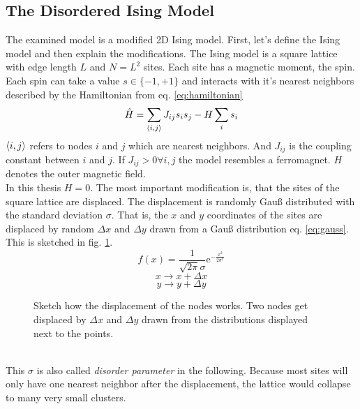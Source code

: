 \subsection{The Disordered Ising Model}
\label{ssec:isingmodel}
    The examined model is a modified 2D Ising model.
    First, let's define the Ising model and then explain the modifications.
    The Ising model is a square lattice with edge length \(L\) and
    \(N=L^2\) sites. Each site has a magnetic moment, the spin. Each
    spin can take a value \(s \in \{-1,+1\}\) and interacts with it's
    nearest neighbors described by the Hamiltonian from eq. \eqref{eq:hamiltonian}
    \begin{equation}
        \hat{H} = \sum_{\left< i,j \right>}J_{ij}s_{i}s_{j} - H \sum_i s_i
        \label{eq:hamiltonian}
    \end{equation}
    \(\left< i,j \right>\) refers to nodes \(i\) and \(j\) which are nearest
    neighbors. And \(J_{ij}\) is the coupling constant between \(i\) and
    \(j\). If \(J_{ij} > 0 \forall i,j\) the model resembles a ferromagnet.
    \(H\) denotes the outer magnetic field.\\
    In this thesis \(H=0\). The most important modification is, that
    the sites of the square lattice are displaced. The
    displacement is randomly Gauß distributed with the standard
    deviation \(\sigma\). That is, the \(x\) and \(y\) coordinates of the
    sites are displaced by random \(\Delta x\) and \(\Delta y\) drawn
    from a Gauß distribution eq. \eqref{eq:gauss}.
    This is sketched in fig. \ref{fig:displacement}.
    \begin{equation}
        f(x)=\frac{1}{\sqrt{2\pi}\sigma}\mathrm{e}^{-\frac{x^2}{2\sigma^2}}
        \label{eq:gauss}
    \end{equation}
    \[x \to x + \Delta x\]
    \[y \to y + \Delta y\]
    \begin{figure}[htbp]
        \centering
        
        \caption[Sketch how the displacement works]
        {
            Sketch how the displacement of the nodes works. Two nodes
            get displaced by \(\Delta x\) and \(\Delta y\) drawn from the
            distributions displayed next to the points.
        }
        \label{fig:displacement}
    \end{figure}\\
    This \(\sigma\) is also called \emph{disorder parameter} in the following.
    Because most sites will only have one nearest neighbor after the
    displacement, the lattice would collapse to many very small clusters.
